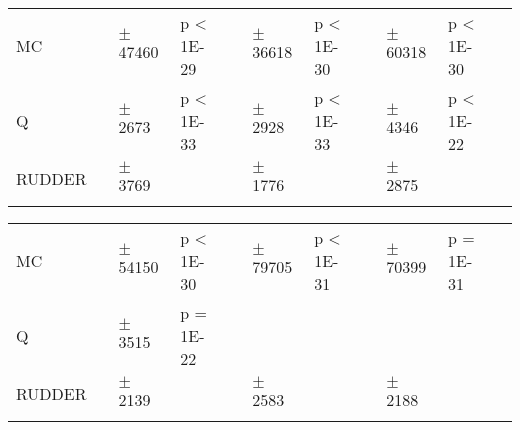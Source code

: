 \documentclass{article}
\begin{document}
\begin{appendices}
\begin{landscape}
\begin{table}[htp]
\begin{flushleft}
\begin{tabular}{*{1}{>{\raggedright}p{6em}}*{1}{>{\raggedleft}p{4em}}*{1}{>{\raggedleft}p{5em}}*{1}{>{\raggedright}p{5em}}*{1}{>{\columncolor{mColor1}\raggedleft}p{4em}}*{1}{>{\columncolor{mColor1}\raggedleft}p{5em}}*{1}{>{\columncolor{mColor1}\raggedright}p{5em}}*{1}{>{\raggedleft}p{4em}}*{1}{>{\raggedleft}p{5em}}*{1}{>{\raggedright}p{5em}}*{1}{>{\raggedright}p{0.01em}}}
\toprule[1pt]
\addlinespace[2pt]
{\bf Method} &\multicolumn{3}{c}{\bf Delay 25} &\multicolumn{3}{c}{\bf Delay 30} &\multicolumn{3}{c}{\bf Delay 35} &\\
\toprule[1pt]
MC & 39772 & {\small $\pm$ 47460} & {\small p < 1E-29} & 41922 & {\small $\pm$ 36618} & {\small p < 1E-30} & 50464 & {\small $\pm$ 60318} & {\small p < 1E-30} &  \\
Q & 234912 & {\small $\pm$ 2673} & {\small p < 1E-33} & 305894 & {\small $\pm$ 2928} & {\small p < 1E-33} & 383422 & {\small $\pm$ 4346} & {\small p < 1E-22} &  \\
RUDDER & 4112 & {\small $\pm$ 3769} &  & 3667 & {\small $\pm$ 1776} &  & 3850 & {\small $\pm$ 2875} & &  \\
\addlinespace[1pt]
\end{tabular}
\end{flushleft}

\begin{flushleft}
\begin{tabular}{*{1}{>{\raggedright}p{6em}}*{1}{>{\columncolor{mColor1}\raggedleft}p{4em}}*{1}{>{\columncolor{mColor1}\raggedleft}p{5em}}*{1}{>{\columncolor{mColor1}\raggedright}p{5em}}*{1}{>{\raggedleft}p{4em}}*{1}{>{\raggedleft}p{5em}}*{1}{>{\raggedright}p{5em}}*{1}{>{\columncolor{mColor1}\raggedleft}p{4em}}*{1}{>{\columncolor{mColor1}\raggedleft}p{5em}}*{1}{>{\columncolor{mColor1}\raggedright}p{5em}}*{1}{>{\raggedright}p{0.01em}}}
\toprule[1pt]
\addlinespace[2pt]
{\bf Method} &\multicolumn{3}{c}{\bf Delay 40} &\multicolumn{3}{c}{\bf Delay 45} &\multicolumn{3}{c}{\bf Delay 50} &\\
\toprule[1pt]
MC & 56945 & {\small $\pm$ 54150} & {\small p < 1E-30} & 69845 & {\small $\pm$ 79705} & {\small p < 1E-31} & 73243 & {\small $\pm$ 70399} & {\small p = 1E-31} &  \\
Q & 466531 & {\small $\pm$ 3515} & {\small p = 1E-22} &  &  &  &  &  &  &  \\
RUDDER & 3739 & {\small $\pm$ 2139} &  & 4151 & {\small $\pm$ 2583} &  & 3884 & {\small $\pm$ 2188} &  &  \\
\addlinespace[1pt]
\end{tabular}
\end{flushleft}


\end{table}
\end{landscape}
\end{appendices}
\end{document}
